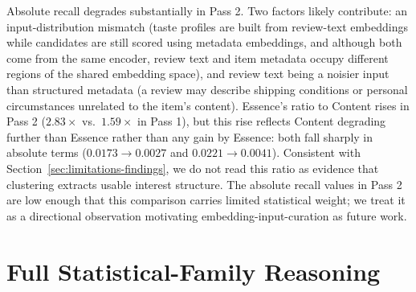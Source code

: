 \documentclass{article}
\begin{document}
Absolute recall degrades substantially in Pass 2. Two factors likely contribute: an input-distribution mismatch (taste profiles are built from review-text embeddings while candidates are still scored using metadata embeddings, and although both come from the same encoder, review text and item metadata occupy different regions of the shared embedding space), and review text being a noisier input than structured metadata (a review may describe shipping conditions or personal circumstances unrelated to the item's content). Essence's ratio to Content rises in Pass 2 ($2.83\times$ vs.\ $1.59\times$ in Pass 1), but this rise reflects Content degrading further than Essence rather than any gain by Essence: both fall sharply in absolute terms ($0.0173\to0.0027$ and $0.0221\to0.0041$). Consistent with Section~\ref{sec:limitations-findings}, we do not read this ratio as evidence that clustering extracts usable interest structure. The absolute recall values in Pass 2 are low enough that this comparison carries limited statistical weight; we treat it as a directional observation motivating embedding-input-curation as future work.

\section{Full Statistical-Family Reasoning}
\label{app:fdr}
\end{document}
